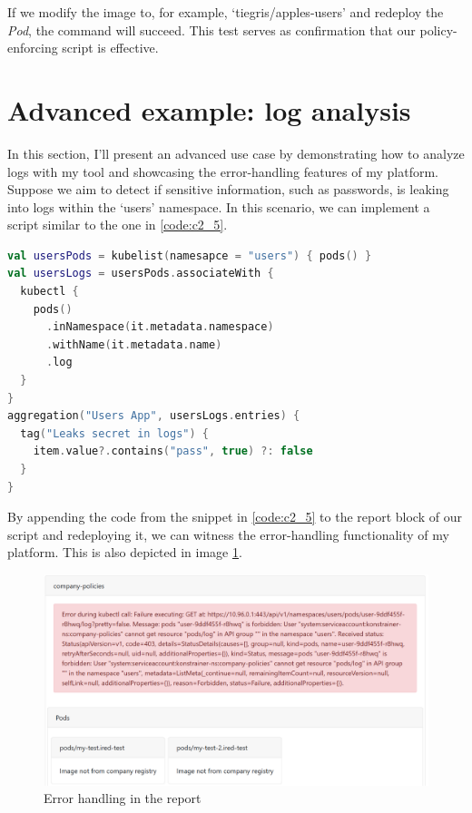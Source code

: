 If we modify the image to, for example, `tiegris/apples-users' and redeploy the \emph{Pod}, the command will succeed. This test serves as confirmation that our policy-enforcing script is effective.

\clearpage
\section{Advanced example: log analysis}

In this section, I'll present an advanced use case by demonstrating how to analyze logs with my tool and showcasing the error-handling features of my platform. Suppose we aim to detect if sensitive information, such as passwords, is leaking into logs within the `users' namespace. In this scenario, we can implement a script similar to the one in \ref{code:c2_5}.

\begin{lstlisting}[caption={Detecting leaking of credentials},language=Kotlin,label=code:c2_5]
val usersPods = kubelist(namesapce = "users") { pods() }
val usersLogs = usersPods.associateWith {
  kubectl {
    pods()
      .inNamespace(it.metadata.namespace)
      .withName(it.metadata.name)
      .log
  }
}
aggregation("Users App", usersLogs.entries) {
  tag("Leaks secret in logs") {
    item.value?.contains("pass", true) ?: false
  }
}
\end{lstlisting}

By appending the code from the snippet in \ref{code:c2_5} to the report block of our script and redeploying it, we can witness the error-handling functionality of my platform. This is also depicted in image \ref{fig:report_err}.

\begin{figure}[h]
  \centering
  \includegraphics[width=150mm, keepaspectratio]{content/60_caseStudy2/error.png}
  \caption{Error handling in the report}
  \label{fig:report_err}
\end{figure}

